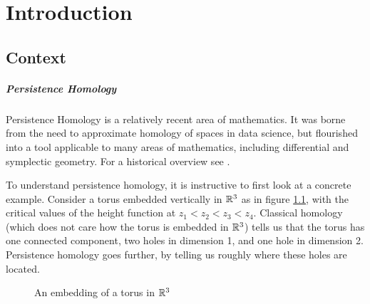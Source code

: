 
\chapter{Introduction}

\section{Context}

\paragraph{Persistence Homology}
Persistence Homology is a relatively recent area of mathematics. It was borne from the need to approximate homology of spaces in data science, but flourished into a tool applicable to many areas of mathematics, including differential and symplectic geometry. For a historical overview see \cite{historypersistence}.

To understand persistence homology, it is instructive to first look at a concrete example. Consider a torus embedded vertically in $\mathbb{R}^3$ as in figure \ref{fig:torus1}, with the critical values of the height function at 
$z_1 < z_2 < z_3 < z_4$. Classical homology (which does not care how the torus is embedded in $\mathbb{R}^3$) tells us that the torus has one connected component, two holes in dimension 1, and one hole in dimension 2. Persistence homology goes further, by telling us roughly where these holes are located.

\begin{figure}
\centering
{}
\caption{An embedding of a torus in $\mathbb{R}^3$}\label{fig:torus1}
\end{figure}

